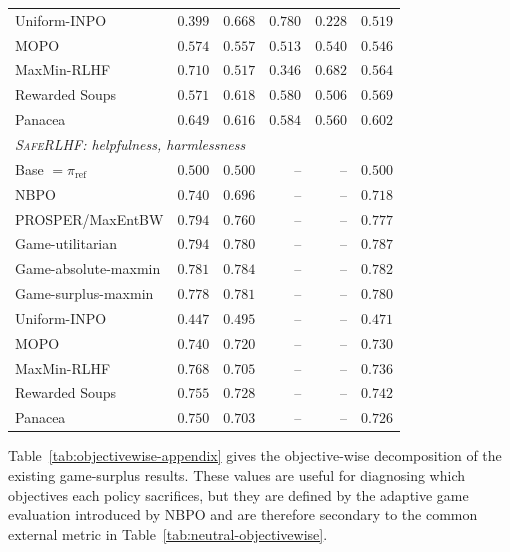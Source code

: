 \documentclass{article}
\theoremstyle{remark}
\theoremstyle{plain}
\newcommand{\piref}{\pi_{\mathrm{ref}}}
\newcommand{\NBPO}{\textsc{NBPO}}
\begin{document}
\begin{table}[t]
\begin{tabular}{lrrrrr}
Uniform-INPO & $0.399$ & $0.668$ & $0.780$ & $0.228$ & $0.519$\\
MOPO & $0.574$ & $0.557$ & $0.513$ & $0.540$ & $0.546$\\
MaxMin-RLHF & $0.710$ & $0.517$ & $0.346$ & $0.682$ & $0.564$\\
Rewarded Soups & $0.571$ & $0.618$ & $0.580$ & $0.506$ & $0.569$\\
Panacea & $0.649$ & $0.616$ & $0.584$ & $0.560$ & $0.602$\\
\midrule
\multicolumn{6}{l}{\textit{\textsc{SafeRLHF}: helpfulness, harmlessness}}\\
Base $=\piref$ & $0.500$ & $0.500$ & -- & -- & $0.500$\\
\NBPO{} & $0.740$ & $0.696$ & -- & -- & $0.718$\\
PROSPER/MaxEntBW & $0.794$ & $0.760$ & -- & -- & $0.777$\\
Game-utilitarian & $0.794$ & $0.780$ & -- & -- & $0.787$\\
Game-absolute-maxmin & $0.781$ & $0.784$ & -- & -- & $0.782$\\
Game-surplus-maxmin & $0.778$ & $0.781$ & -- & -- & $0.780$\\
Uniform-INPO & $0.447$ & $0.495$ & -- & -- & $0.471$\\
MOPO & $0.740$ & $0.720$ & -- & -- & $0.730$\\
MaxMin-RLHF & $0.768$ & $0.705$ & -- & -- & $0.736$\\
Rewarded Soups & $0.755$ & $0.728$ & -- & -- & $0.742$\\
Panacea & $0.750$ & $0.703$ & -- & -- & $0.726$\\
\bottomrule
\end{tabular}
\end{table}

Table~\ref{tab:objectivewise-appendix} gives the objective-wise decomposition of the existing game-surplus results. These values are useful for diagnosing which objectives each policy sacrifices, but they are defined by the adaptive game evaluation introduced by NBPO and are therefore secondary to the common external metric in Table~\ref{tab:neutral-objectivewise}.
\end{document}
